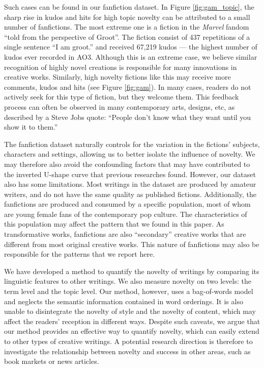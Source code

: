 \documentclass[letterpaper]{article} %
\begin{document}
Such cases can be found in our fanfiction dataset. In Figure \ref{fig:gam_topic}, the sharp rise in kudos and hits for high topic novelty can be attributed to a small number of fanfictions. The most extreme one is a fiction in the \emph{Marvel} fandom ``told from the perspective of Groot''. The fiction consist of 437 repetitions of a single sentence ``I am groot.'' and received 67,219 kudos --- the highest number of kudos ever recorded in AO3. Although this is an extreme case, we believe similar recognition of highly novel creations is responsible for many innovations in creative works. Similarly, high novelty fictions like this may receive more comments, kudos and hits (see Figure \ref{fig:gam}). In many cases, readers do not actively seek for this type of fiction, but they welcome them. This feedback process can often be observed in many contemporary arts, designs, etc, as described by a Steve Jobs quote: ``People don't know what they want until you show it to them.''

The fanfiction dataset naturally controls for the variation in the fictions' subjects, characters and settings, allowing us to better isolate the influence of novelty. We may therefore also avoid the confounding factors that may have contributed to the inverted U-shape curve that previous researches found. However, our dataset also has some limitations. Most writings in the dataset are produced by amateur writers, and do not have the same quality as published fictions. Additionally, the fanfictions are produced and consumed by a specific population, most of whom are young female fans of the contemporary pop culture. The characteristics of this population may affect the pattern that we found in this paper. As transformative works, fanfictions are also ``secondary'' creative works that are different from most original creative works. This nature of fanfictions may also be responsible for the patterns that we report here.

We have developed a method to quantify the novelty of writings by comparing its linguistic features to other writings. We also measure novelty on two levels: the term level and the topic level. Our method, however, uses a bag-of-words model and neglects the semantic information contained in word orderings. It is also unable to disintegrate the novelty of style and the novelty of content, which may affect the readers' reception in different ways. Despite such caveats, we argue that our method provides an effective way to quantify novelty, which can easily extend to other types of creative writings. A potential research direction is therefore to investigate the relationship between novelty and success in other areas, such as book markets or news articles.
\end{document}
